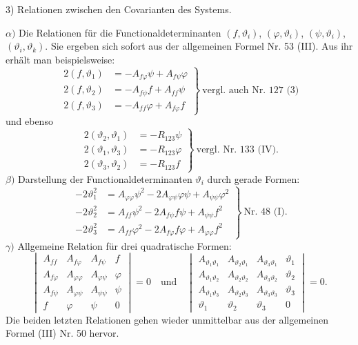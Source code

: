 3) Relationen zwischen den Covarianten des Systems.

$\alpha)$ Die Relationen f\"ur die Functionaldeterminanten $(f,\vartheta_i)$, $(\varphi,\vartheta_i)$, $(\psi,\vartheta_i)$, $(\vartheta_i,\vartheta_k)$. Sie ergeben sich sofort aus der allgemeinen Formel Nr. 53 (III). Aus ihr erh\"alt man beispielsweise:
\[
\left.\begin{aligned}
2(f,\vartheta_1) &= -A_{f\varphi}\psi+A_{f\psi}\varphi\\
2(f,\vartheta_2) &= -A_{f\psi}f+A_{ff}\psi\\
2(f,\vartheta_3) &= -A_{ff}\varphi+A_{f\varphi}f
\end{aligned}\right\}\ \text{vergl. auch Nr. 127 (3)}
\]
und ebenso
\[
\left.\begin{aligned}
2(\vartheta_2,\vartheta_1) &= -R_{123}\psi\\
2(\vartheta_1,\vartheta_3) &= -R_{123}\varphi\\
2(\vartheta_3,\vartheta_2) &= -R_{123}f
\end{aligned}\right\}\ \text{vergl. Nr. 133 (IV).}
\]
$\beta)$ Darstellung der Functionaldeterminanten $\vartheta_i$ durch gerade Formen:
\[
\left.\begin{aligned}
-2\vartheta_1^2 &= A_{\varphi\varphi}\psi^2-2A_{\varphi\psi}\varphi\psi+A_{\psi\psi}\varphi^2\\
-2\vartheta_2^2 &= A_{ff}\psi^2-2A_{f\psi}f\psi+A_{\psi\psi}f^2\\
-2\vartheta_3^2 &= A_{ff}\varphi^2-2A_{f\varphi}f\varphi+A_{\varphi\varphi}f^2
\end{aligned}\right\}\ \text{Nr. 48 (I).}
\]
$\gamma)$ Allgemeine Relation f\"ur drei quadratische Formen:
\[
\begin{vmatrix}
A_{ff} & A_{f\varphi} & A_{f\psi} & f\\
A_{f\varphi} & A_{\varphi\varphi} & A_{\varphi\psi} & \varphi\\
A_{f\psi} & A_{\varphi\psi} & A_{\psi\psi} & \psi\\
f & \varphi & \psi & 0
\end{vmatrix}=0
\quad\text{und}\quad
\begin{vmatrix}
A_{\vartheta_1\vartheta_1} & A_{\vartheta_2\vartheta_1} & A_{\vartheta_3\vartheta_1} & \vartheta_1\\
A_{\vartheta_1\vartheta_2} & A_{\vartheta_2\vartheta_2} & A_{\vartheta_3\vartheta_2} & \vartheta_2\\
A_{\vartheta_1\vartheta_3} & A_{\vartheta_2\vartheta_3} & A_{\vartheta_3\vartheta_3} & \vartheta_3\\
\vartheta_1 & \vartheta_2 & \vartheta_3 & 0
\end{vmatrix}=0.
\]
Die beiden letzten Relationen gehen wieder unmittelbar aus der allgemeinen Formel (III) Nr. 50 hervor.


